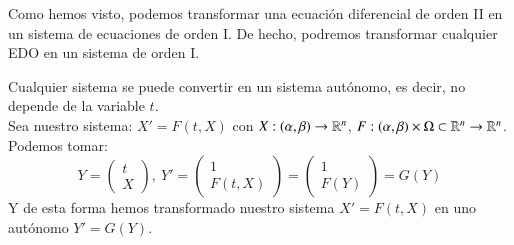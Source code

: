 Como hemos visto, podemos transformar una ecuación diferencial de orden II en un sistema de ecuaciones de orden I. De hecho, podremos transformar cualquier EDO en un sistema de orden I.\\
\begin{obs}
    Cualquier sistema se puede convertir en un sistema autónomo, es decir, no depende de la variable $t$.\\
    Sea nuestro sistema: $X' = F(t, X)$ con $X: (\alpha, \beta) \to \mathbb{R}^n$, $F:(\alpha, \beta) \times \Omega \subset \mathbb{R}^n \to \mathbb{R}^n$. Podemos tomar:
    $$
        Y = \left(\begin{matrix}
            t\\
            X
    \end{matrix}\right),\ Y' = \left(\begin{matrix}
        1\\
        F(t, X)
    \end{matrix}\right) = \left(\begin{matrix}
        1\\
        F(Y)
    \end{matrix}\right) = G(Y)
    $$
    Y de esta forma hemos transformado nuestro sistema $X' = F(t, X)$ en uno autónomo $Y' = G(Y)$.
\end{obs}
